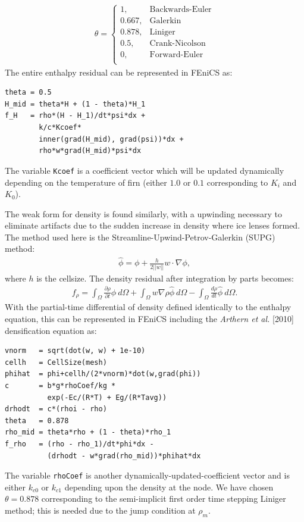 \documentclass{article}%
\begin{document}
\begin{align*}
    \theta = 
    \begin{cases}
      1,       & \text{Backwards-Euler}\\
      0.667,   & \text{Galerkin}\\
      0.878,   & \text{Liniger}\\
      0.5,     & \text{Crank-Nicolson}\\
      0,       & \text{Forward-Euler}\\
    \end{cases}
\end{align*}
The entire enthalpy residual can be represented in FEniCS as:\par
\footnotesize
\begin{verbatim}
theta = 0.5
H_mid = theta*H + (1 - theta)*H_1
f_H   = rho*(H - H_1)/dt*psi*dx + 
        k/c*Kcoef*
        inner(grad(H_mid), grad(psi))*dx + 
        rho*w*grad(H_mid)*psi*dx
\end{verbatim}
\normalsize
The variable \texttt{Kcoef} is a coefficient vector which will be updated dynamically depending on the temperature of firn (either $1.0$ or $0.1$ corresponding to $K_i$ and $K_0$).

The weak form for density is found similarly, with a upwinding necessary to eliminate artifacts due to the sudden increase in density where ice lenses formed.  The method used here is the Streamline-Upwind-Petrov-Galerkin (SUPG) method:
\begin{align*}
    \hat{\phi} = \phi + \frac{h}{2||w||} w \cdot \nabla{\phi},
\end{align*}
where $h$ is the cellsize.  The density residual after integration by parts becomes:
\begin{align*}
  f_{\rho} = 
    \int_{\Omega} \frac{\partial \rho}{\partial t}\phi\ d \Omega + 
    \int_{\Omega} w\nabla \rho \hat{\phi}\ d \Omega -
    \int_{\Omega}\frac{d \rho}{dt}\hat{\phi}\ d \Omega.
\end{align*}
With the partial-time differential of density defined identically to the enthalpy equation, this can be represented in FEniCS including the \emph{Arthern et al.} [2010] densification equation as:\par
\footnotesize
\begin{verbatim}
vnorm   = sqrt(dot(w, w) + 1e-10)
cellh   = CellSize(mesh)
phihat  = phi+cellh/(2*vnorm)*dot(w,grad(phi))
c       = b*g*rhoCoef/kg * 
          exp(-Ec/(R*T) + Eg/(R*Tavg))
drhodt  = c*(rhoi - rho)
theta   = 0.878
rho_mid = theta*rho + (1 - theta)*rho_1
f_rho   = (rho - rho_1)/dt*phi*dx - 
          (drhodt - w*grad(rho_mid))*phihat*dx
\end{verbatim}
\normalsize
The variable \texttt{rhoCoef} is another dynamically-updated-coefficient vector and is either $k_{c0}$ or $k_{c1}$ depending upon the density at the node.  We have chosen $\theta = 0.878$ corresponding to the semi-implicit first order time stepping Liniger method; this is needed due to the jump condition at $\rho_m$.
\end{document}
